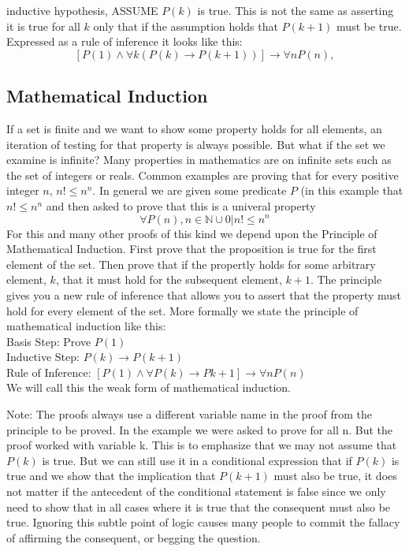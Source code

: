 \documentclass[11pt]{book} %
\theoremstyle {definition}
\theoremstyle {remark}
\begin{document}
    inductive hypothesis, ASSUME $P(k)$ is true. This is not the same as asserting it is true for all $k$ only that if the assumption holds that $P(k+1)$ must be true.
Expressed as a rule of inference it looks like this:
$$[P(1) \land \forall k (P(k) \rightarrow P(k+1))] \rightarrow \forall n P(n),$$














  \subsection {Mathematical Induction}
If a set is finite and we want to show some property holds for all elements, an iteration of testing for that property is always possible. But what if the set we examine is infinite? Many properties in mathematics are on infinite sets such as the set of integers or reals. Common examples are proving that for every positive integer $n$, $n! \leq n^n$. In general we are given some predicate $P$ (in this example that $n! \leq n^n$ and then asked to prove that this is a univeral property
$$\forall P(n), n\in \mathbb{N} \cup {0} | n! \leq n^n$$
For this and many other proofs of this kind we depend upon the Principle of Mathematical Induction. First prove that the proposition is true for the first element of the set. Then prove that if the propertly holds for some arbitrary element, $k$, that it must hold for the subsequent element, $k+1$. The principle gives you a new rule of inference that allows you to assert that the property must hold for every element of the set. More formally we state the principle of mathematical induction like this:\\
Basis Step: Prove $P(1)$ \\
Inductive Step: $P(k) \rightarrow P(k+1)$\\
Rule of Inference: $[P(1) \land \forall P(k) \rightarrow P{k+1}] \rightarrow \forall n P(n)$\\

We will call this the weak form of mathematical induction.

Note: The proofs always use a different variable name in the proof from the principle to be proved. In the example we were asked to prove for all n. But the proof worked with variable k. This is to emphasize that we may not assume that $P(k)$ is true. But we can still use it in a conditional expression that if $P(k)$ is true and we show that the implication that $P(k+1)$ must also be true, it does not matter if the antecedent of the conditional statement is false since we only need to show that in all cases where it is true that the consequent must also be true. Ignoring this subtle point of logic causes many people to commit the fallacy of affirming the consequent, or begging the question.
\end{document}
